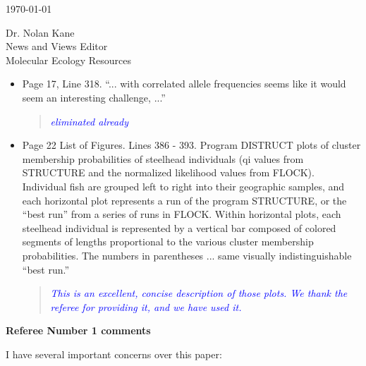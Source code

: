 \documentclass[11pt]{letter}
\newcommand{\reply}[1]{\begin{quotation}\small\sl\textcolor{blue}{#1}\end{quotation}}
\begin{document}
\begin{letter}{ \today 

Dr. Nolan Kane\\
News and Views Editor\\
Molecular Ecology Resources \\
}
\begin{itemize}
\reply{eliminated already}
\item Page 17, Line 318. ``... with correlated allele frequencies seems like it would seem an interesting challenge, ...''
\reply{eliminated already}
\item Page 22 List of Figures. Lines 386 - 393. Program DISTRUCT plots of cluster membership probabilities of steelhead individuals (qi values from STRUCTURE and the normalized likelihood values from FLOCK). Individual fish are grouped left to right into their geographic samples, and each horizontal plot represents a run of the program
STRUCTURE, or the ``best run'' from a series of runs in FLOCK. Within horizontal plots, each steelhead individual is represented by a vertical bar composed of colored segments of lengths proportional to the various cluster membership probabilities. The numbers in parentheses ... same visually indistinguishable ``best run.''
\reply{This is an excellent, concise description of those plots. We thank the referee for 
providing it, and we have used it.}
\end{itemize}


{\bf Referee Number 1 comments}

I have several important concerns over this paper:


\end{letter}
\end{document}
